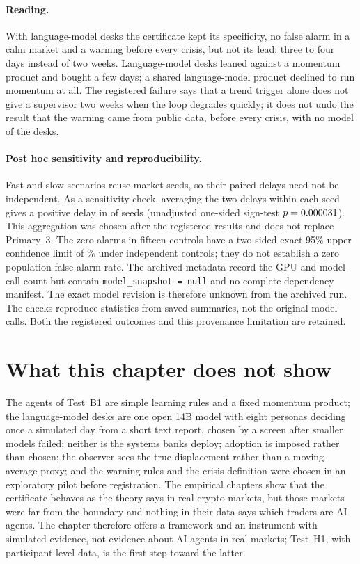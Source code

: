 \paragraph{Reading.} With language-model desks the certificate kept its specificity, no false alarm in a calm market and a warning before every crisis, but not its lead: three to four days instead of two weeks. Language-model desks leaned against a momentum product and bought a few days; a shared language-model product declined to run momentum at all. The registered failure says that a trend trigger alone does not give a supervisor two weeks when the loop degrades quickly; it does not undo the result that the warning came from public data, before every crisis, with no model of the desks.


\paragraph{Post hoc sensitivity and reproducibility.} Fast and slow scenarios reuse market seeds, so their paired delays need not be independent. As a sensitivity check, averaging the two delays within each seed gives a positive delay in \BtwoSeedPositive{} of \BtwoSeedCount{} seeds (unadjusted one-sided sign-test $p=0.000031$). This aggregation was chosen after the registered results and does not replace Primary~3. The zero alarms in fifteen controls have a two-sided exact 95\% upper confidence limit of \BtwoFAUpper\% under independent controls; they do not establish a zero population false-alarm rate. The archived metadata record the GPU and model-call count but contain \texttt{model\_snapshot = null} and no complete dependency manifest. The exact model revision is therefore unknown from the archived run. The checks reproduce statistics from saved summaries, not the original model calls. Both the registered outcomes and this provenance limitation are retained.

\section{What this chapter does not show}\label{sec:ai_limits}

The agents of Test~B1 are simple learning rules and a fixed momentum product; the language-model desks are one open 14B model with eight personas deciding once a simulated day from a short text report, chosen by a screen after smaller models failed; neither is the systems banks deploy; adoption is imposed rather than chosen; the observer sees the true displacement rather than a moving-average proxy; and the warning rules and the crisis definition were chosen in an exploratory pilot before registration. The empirical chapters show that the certificate behaves as the theory says in real crypto markets, but those markets were far from the boundary and nothing in their data says which traders are AI agents. The chapter therefore offers a framework and an instrument with simulated evidence, not evidence about AI agents in real markets; Test~H1, with participant-level data, is the first step toward the latter.
